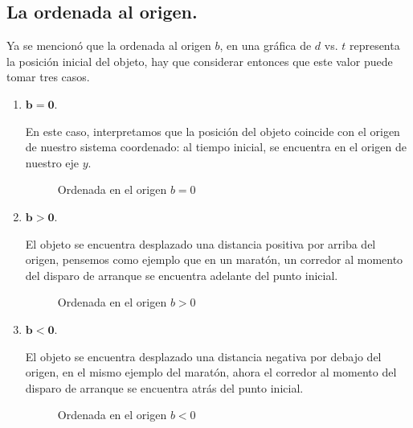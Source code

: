 \documentclass[14pt]{extarticle}
\begin{document}
\subsection{La ordenada al origen.}

Ya se mencionó que la ordenada al origen $b$, en una gráfica de $d$ vs. $t$ representa la posición inicial del objeto, hay que considerar entonces que este valor puede tomar tres casos.

\begin{enumerate}[label=\alph*)]
\item $\mathbf{b = 0}$.

En este caso, interpretamos que la posición del objeto coincide con el origen de nuestro sistema coordenado: al tiempo inicial, se encuentra en el origen de nuestro eje $y$.
\begin{figure}[H]
    \centering
    \caption{Ordenada en el origen $b = 0$}
\end{figure}
\item $\mathbf{b > 0}$.

El objeto se encuentra desplazado una distancia positiva por arriba del origen, pensemos como ejemplo que en un maratón, un corredor al momento del disparo de arranque se encuentra adelante del punto inicial.
\begin{figure}[H]
    \centering
    \caption{Ordenada en el origen $b > 0$}
\end{figure}
\item $\mathbf{b < 0}$.

El objeto se encuentra desplazado una distancia negativa por debajo del origen, en el mismo ejemplo del maratón, ahora el corredor al momento del disparo de arranque se encuentra atrás del punto inicial.
\begin{figure}[H]
    \centering
    \caption{Ordenada en el origen $b < 0$}
\end{figure}
\end{enumerate}
\end{document}
